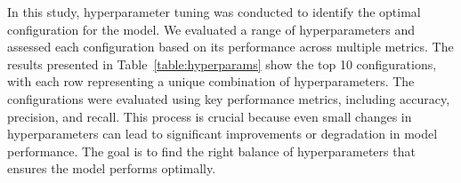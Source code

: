\documentclass[conference]{IEEEtran}
\begin{document}
\begin{table}[h]
\centering
\renewcommand{\arraystretch}{1.5}
\vspace{.6em}
\caption{Top Hyperparameter Configurations During Tuning}
\label{table:hyperparams}
\end{table}

\vspace{-1.5em}
In this study, hyperparameter tuning was conducted to identify the optimal configuration for the model. We evaluated a range of hyperparameters and assessed each configuration based on its performance across multiple metrics. The results presented in Table~\ref{table:hyperparams} show the top 10 configurations, with each row representing a unique combination of hyperparameters. The configurations were evaluated using key performance metrics, including accuracy, precision, and recall. This process is crucial because even small changes in hyperparameters can lead to significant improvements or degradation in model performance. The goal is to find the right balance of hyperparameters that ensures the model performs optimally.
\end{document}
